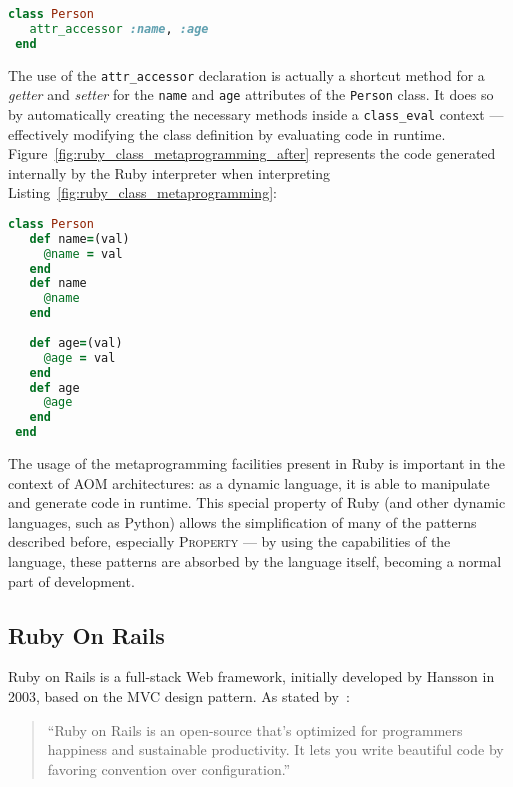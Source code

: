 \begin{lstlisting}[language=ruby, float=htb, label=fig:ruby_class_metaprogramming, caption=Metaprogramming in Ruby classes.]
 class Person
   attr_accessor :name, :age
 end
\end{lstlisting}

The use of the \verb!attr_accessor! declaration is actually a shortcut method for a \emph{getter} and \emph{setter} for the \verb!name! and \verb!age! attributes of the \verb!Person! class. It does so by automatically creating the necessary methods inside a \verb!class_eval! context --- effectively modifying the class definition by evaluating code in runtime. Figure~\ref{fig:ruby_class_metaprogramming_after} represents the code generated internally by the Ruby interpreter when interpreting Listing~\ref{fig:ruby_class_metaprogramming}:

\begin{lstlisting}[language=ruby, float=htb, label=fig:ruby_class_metaprogramming_after, caption=Code generated by Ruby metaprogramming constructs.]
 class Person
   def name=(val)
     @name = val
   end
   def name
     @name
   end
   
   def age=(val)
     @age = val
   end
   def age
     @age
   end
 end
\end{lstlisting}

The usage of the metaprogramming facilities present in Ruby is important in the context of AOM architectures: as a dynamic language, it is able to manipulate and generate code in runtime. This special property of Ruby (and other dynamic languages, such as Python) allows the simplification of many of the patterns described before, especially \textsc{Property} --- by using the capabilities of the language, these patterns are absorbed by the language itself, becoming a normal part of development.

\subsection{Ruby On Rails}\label{sec:ror}

Ruby on Rails is a full-stack Web framework, initially developed by Hansson in 2003, based on the MVC design pattern. As stated by~\cite{rubyonrails}:

\begin{quote}
  ``Ruby on Rails is an open-source that's optimized for programmers happiness and sustainable productivity. It lets you write beautiful code by favoring convention over configuration.''
\end{quote}

